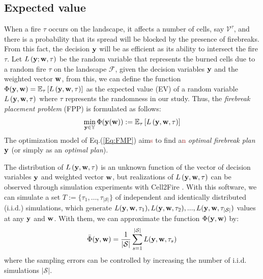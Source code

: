 \documentclass[a4paper,fleqn]{cas-sc}
\begin{document}
\subsection{Expected value}
When a fire $\tau$ occurs on the landscape, it affects a number of cells, say $\mathcal{V}^\tau$, and there is a probability that its spread will be blocked by the presence of firebreaks. From this fact, the decision $\vb{y}$ will be as efficient as its ability to intersect the fire $\tau$. Let $ L\left(\vb{y}; \vb{w}, \tau \right) $ be the random variable that represents the burned cells due to a random fire $\tau$ on the landscape $\mathcal{F}$, given the decision variables $\vb{y}$ and the weighted vector $\vb{w}$, from this, we can define the function $\Phi(\vb{y},\vb{w})=\mathbb{E}_\mathcal{\tau} \left[ L \left(\vb{y}, \vb{w}, \tau \right) \right]$ as the expected value (EV) of a random variable $ L\left(\vb{y}, \vb{w}, \tau \right) $ where $\tau$  represents the randomness in our study. Thus, the \textit{firebreak placement problem} (FPP) is formulated as follows:   
\begin{equation} \label{Eq:FMP}
    \min_{\vb{y} \in \mathbb{Y}} \Phi(\vb{y(\vb{w})}):=\mathbb{E}_\mathcal{\tau} \left[ L \left(\vb{y}, \vb{w}, \tau \right) \right]
\end{equation}
The optimization model of Eq.\:(\ref{Eq:FMP}) aim\textcolor{brown}{s} to find a\textcolor{brown}{n} \textit{optimal firebreak plan} $\vb{
y}$ (or simply as an \textit{optimal plan}).



The distribution of $ L\left(\vb{y}, \vb{w},\tau \right) $ is an unknown function of the vector of decision variables $\vb{y}$ and weighted vector $\vb{w}$, but realizations of $ L\left(\vb{y}, \vb{w}, \tau \right) $ can be observed through simulation experiments with Cell2Fire \citep{pais2021cell2fire}. With this software, we can simulate a set $T := \{\tau_1, \dots, \tau_{\lvert \mathcal{S}\vert}\}$  of independent and identically distributed (i.i.d.) simulations, which generate $L(\vb{y}, \vb{w}, \tau_1),L(\vb{y}, \vb{w}, \tau_2),...,L(\vb{y}, \vb{w}, \tau_{\lvert \mathcal{S}\vert})$ values at any $\vb{y}$ and $\vb{w}$. With them, we can approximate the function $\Phi(\vb{y}, \vb{w})$ by:
\begin{equation} \label{Eq:EVAL}
    \Bar{\Phi}(\vb{y}, \vb{w}) = \dfrac{1}{\lvert \mathcal{S}\vert} \sum_{s=1}^{\lvert \mathcal{S}\vert}L(\vb{y}, \vb{w},\tau_s)
\end{equation}
where the sampling errors can be controlled by increasing the number of i.i.d. simulations $\lvert \mathcal{S}\vert$.
\end{document}
